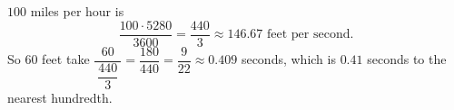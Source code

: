 $100$ miles per hour is
\[\dfrac{100\cdot5280}{3600}=\dfrac{440}{3}\approx146.67\text{ feet per second}.\]
So $60$ feet take $\dfrac{60}{\ \dfrac{440}{3}\ }=\dfrac{180}{440}=\dfrac{9}{22}\approx0.409$ seconds, which is $\boxed{0.41}$ seconds to the nearest hundredth.
